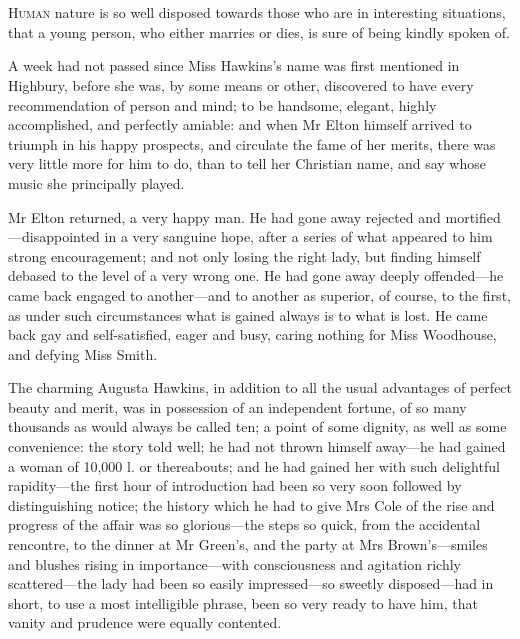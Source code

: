 \chapter[Chapter \thechapter]{}
\lettrine[lraise=0.3]{H}{uman} nature is so well disposed towards those who are in interesting situations, that a young person, who either marries or dies, is sure of being kindly spoken of.

\zz
A week had not passed since Miss Hawkins's name was first mentioned in Highbury, before she was, by some means or other, discovered to have every recommendation of person and mind; to be handsome, elegant, highly accomplished, and perfectly amiable: and when Mr Elton himself arrived to triumph in his happy prospects, and circulate the fame of her merits, there was very little more for him to do, than to tell her Christian name, and say whose music she principally played.

Mr Elton returned, a very happy man. He had gone away rejected and mortified—disappointed in a very sanguine hope, after a series of what appeared to him strong encouragement; and not only losing the right lady, but finding himself debased to the level of a very wrong one. He had gone away deeply offended—he came back engaged to another—and to another as superior, of course, to the first, as under such circumstances what is gained always is to what is lost. He came back gay and self-satisfied, eager and busy, caring nothing for Miss Woodhouse, and defying Miss Smith.

The charming Augusta Hawkins, in addition to all the usual advantages of perfect beauty and merit, was in possession of an independent fortune, of so many thousands as would always be called ten; a point of some dignity, as well as some convenience: the story told well; he had not thrown himself away—he had gained a woman of 10,000 l. or thereabouts; and he had gained her with such delightful rapidity—the first hour of introduction had been so very soon followed by distinguishing notice; the history which he had to give Mrs Cole of the rise and progress of the affair was so glorious—the steps so quick, from the accidental rencontre, to the dinner at Mr Green's, and the party at Mrs Brown's—smiles and blushes rising in importance—with consciousness and agitation richly scattered—the lady had been so easily impressed—so sweetly disposed—had in short, to use a most intelligible phrase, been so very ready to have him, that vanity and prudence were equally contented.


